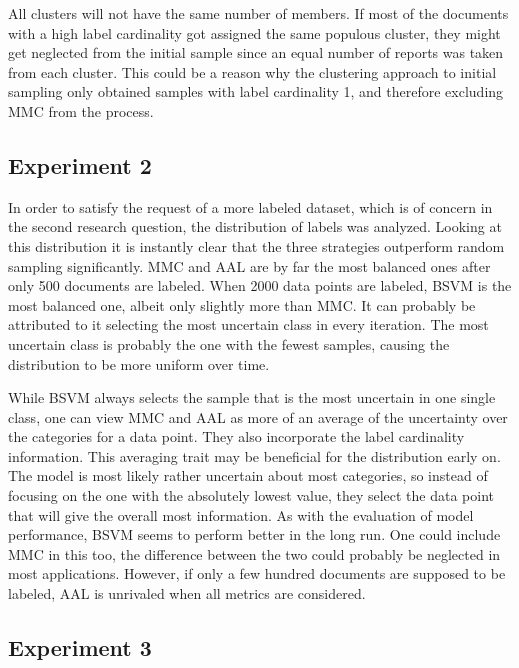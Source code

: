 All clusters will not have the same number of members.
If most of the documents with a high label cardinality got assigned the same populous cluster, they might get neglected from the initial sample since an equal number of reports was taken from each cluster.
This could be a reason why the clustering approach to initial sampling only obtained samples with label cardinality 1, and therefore excluding MMC from the process.

\subsection{Experiment 2}

In order to satisfy the request of a more labeled dataset, which is of concern in the second research question, the distribution of labels was analyzed.
Looking at this distribution it is instantly clear that the three strategies outperform random sampling significantly.
MMC and AAL are by far the most balanced ones after only 500 documents are labeled.
When 2000 data points are labeled, BSVM is the most balanced one, albeit only slightly more than MMC.
It can probably be attributed to it selecting the most uncertain class in every iteration.
The most uncertain class is probably the one with the fewest samples, causing the distribution to be more uniform over time.

While BSVM always selects the sample that is the most uncertain in one single class, one can view MMC and AAL as more of an average of the uncertainty over the categories for a data point.
They also incorporate the label cardinality information.
This averaging trait may be beneficial for the distribution early on.
The model is most likely rather uncertain about most categories, so instead of focusing on the one with the absolutely lowest value, they select the data point that will give the overall most information.
As with the evaluation of model performance, BSVM seems to perform better in the long run.
One could include MMC in this too, the difference between the two could probably be neglected in most applications.
However, if only a few hundred documents are supposed to be labeled, AAL is unrivaled when all metrics are considered.

\subsection{Experiment 3}


